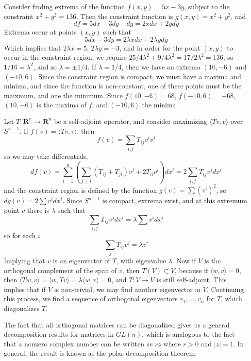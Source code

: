 \begin{example}
    Consider finding extrema of the function $f(x,y) = 5x - 3y$, subject to the constraint $x^2 + y^2 = 136$. Then the constraint function is $g(x,y) = x^2 + y^2$, and
    \[ df = 5dx - 3dy\ \ \ \ \ dg = 2x dx + 2y dy \]
    Extrema occur at points $(x,y)$ such that
    \[ 5dx - 3dy = 2 \lambda x dx + 2 \lambda y dy \]
    Which implies that $2 \lambda x = 5$, $2 \lambda y = -3$, and in order for the point $(x,y)$ to occur in the constraint region, we require $25/4 \lambda^2 + 9/4 \lambda^2 = 17/2\lambda^2 = 136$, so $1/16 = \lambda^2$, and so $\lambda = \pm 1/4$. If $\lambda = 1/4$, then we have an extrema $(10, -6)$ and $(-10, 6)$. Since the constraint region is compact, we must have a maxima and minima, and since the function is non-constant, one of these points must be the maixmum, and one the minimum. Since $f(10,-6) = 68$, $f(-10,6) = -68$, $(10,-6)$ is the maxima of $f$, and $(-10,6)$ the minima.
\end{example}

\begin{example}
    Let $T: \mathbf{R}^n \to \mathbf{R}^n$ be a self-adjoint operator, and consider maximizing $\langle Tv, v \rangle$ over $S^{n-1}$. If $f(v) = \langle Tv, v \rangle$, then
    \[ f(v) = \sum_{i,j} T_{ij} v^i v^j \]
    so we may take differentials,
    \[ df(v) = \sum_{i = 1}^n \left( \sum_{j \neq i} (T_{ij} + T_{ji}) v^j + 2 T_{ii} v^i \right) dx^i = 2 \sum_{i,j} T_{ij} v^j dx^i \]
    and the constraint region is defined by the function $g(v) = \sum (v^i)^2$, so $dg(v) = 2 \sum v^i dx^i$. Since $S^{n-1}$ is compact, extrema exist, and at this extremum point $v$ there is $\lambda$ such that
    \[ \sum_{i,j} T_{ij} v^j dx^i = \lambda \sum v^i dx^i \]
    so for each $i$
    \[ \sum_{j} T_{ij} v^j = \lambda v^i \]
    Implying that $v$ is an eigenvector of $T$, with eigenvalue $\lambda$. Now if $V$ is the orthogonal complement of the span of $v$, then $T(V) \subset V$, because if $\langle w, v \rangle = 0$, then $\langle Tw, v \rangle = \langle w, Tv \rangle = \lambda \langle w, v \rangle = 0$, and $T: V \to V$ is still self-adjoint. This implies that if $V$ is non-trivial, we may find another eigenvector in $V$. Continuing this process, we find a sequence of orthogonal eigenvectors $v_1, \dots, v_n$ for $T$, which diagonalizes $T$.
\end{example}

The fact that all orthogonal matrices can be diagonalized gives us a general decomposition results for matrices in $GL(n)$, which is analogous to the fact that a nonzero complex number can be written as $rz$ where $r > 0$ and $|z| = 1$. In general, the result is known as the polar decomposition theorem.

